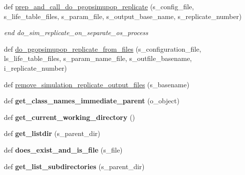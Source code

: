 \begin{DoxyCompactItemize}
\item 
def \hyperlink{namespacenegui_1_1pgutilities_a33737d6b655651fd586e77e269300eb4}{prep\+\_\+and\+\_\+call\+\_\+do\+\_\+pgopsimupop\+\_\+replicate} (s\+\_\+config\+\_\+file, s\+\_\+life\+\_\+table\+\_\+files, s\+\_\+param\+\_\+file, s\+\_\+output\+\_\+base\+\_\+name, s\+\_\+replicate\+\_\+number)
\begin{DoxyCompactList}\small\item\em end do\+\_\+sim\+\_\+replicate\+\_\+on\+\_\+separate\+\_\+os\+\_\+process \end{DoxyCompactList}\item 
def \hyperlink{namespacenegui_1_1pgutilities_af3612d8b0b5d45a71109ea49eec4f9b0}{do\+\_\+pgopsimupop\+\_\+replicate\+\_\+from\+\_\+files} (s\+\_\+configuration\+\_\+file, ls\+\_\+life\+\_\+table\+\_\+files, s\+\_\+param\+\_\+name\+\_\+file, s\+\_\+outfile\+\_\+basename, i\+\_\+replicate\+\_\+number)
\item 
def \hyperlink{namespacenegui_1_1pgutilities_aa37c7d125e4eaec2eeea639f53fa140d}{remove\+\_\+simulation\+\_\+replicate\+\_\+output\+\_\+files} (s\+\_\+basename)
\item 
def {\bfseries get\+\_\+class\+\_\+names\+\_\+immediate\+\_\+parent} (o\+\_\+object)\hypertarget{namespacenegui_1_1pgutilities_a6ab2e254a7954f6a3ad216cbbb18436c}{}\label{namespacenegui_1_1pgutilities_a6ab2e254a7954f6a3ad216cbbb18436c}

\item 
def {\bfseries get\+\_\+current\+\_\+working\+\_\+directory} ()\hypertarget{namespacenegui_1_1pgutilities_ada6bbd0893b0b9ecea89245329058e30}{}\label{namespacenegui_1_1pgutilities_ada6bbd0893b0b9ecea89245329058e30}

\item 
def {\bfseries get\+\_\+listdir} (s\+\_\+parent\+\_\+dir)\hypertarget{namespacenegui_1_1pgutilities_a46ba7adf1f3b80ee22ab635fa22ec8fa}{}\label{namespacenegui_1_1pgutilities_a46ba7adf1f3b80ee22ab635fa22ec8fa}

\item 
def {\bfseries does\+\_\+exist\+\_\+and\+\_\+is\+\_\+file} (s\+\_\+file)\hypertarget{namespacenegui_1_1pgutilities_a1be11f0c22a8f0b3cd2574ba02c2e04a}{}\label{namespacenegui_1_1pgutilities_a1be11f0c22a8f0b3cd2574ba02c2e04a}

\item 
def {\bfseries get\+\_\+list\+\_\+subdirectories} (s\+\_\+parent\+\_\+dir)\hypertarget{namespacenegui_1_1pgutilities_aa598e123d913111c3f191c0a725b57fd}{}\label{namespacenegui_1_1pgutilities_aa598e123d913111c3f191c0a725b57fd}


\end{DoxyCompactItemize}
